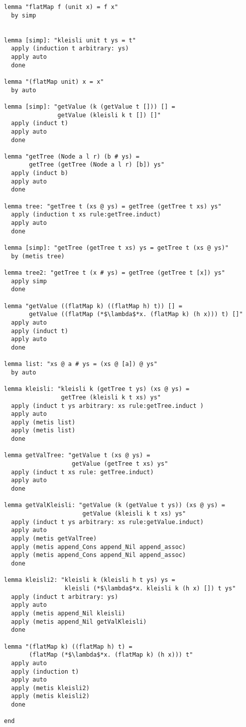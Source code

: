 \begin{lstlisting}[language=Isabelle]
lemma "flatMap f (unit x) = f x"
  by simp


lemma [simp]: "kleisli unit t ys = t"
  apply (induction t arbitrary: ys)
  apply auto
  done

lemma "(flatMap unit) x = x"
  by auto
  
lemma [simp]: "getValue (k (getValue t [])) [] = 
               getValue (kleisli k t []) []"
  apply (induct t)
  apply auto
  done

lemma "getTree (Node a l r) (b # ys) = 
       getTree (getTree (Node a l r) [b]) ys"
  apply (induct b)
  apply auto
  done

lemma tree: "getTree t (xs @ ys) = getTree (getTree t xs) ys"
  apply (induction t xs rule:getTree.induct)
  apply auto
  done

lemma [simp]: "getTree (getTree t xs) ys = getTree t (xs @ ys)"
  by (metis tree)

lemma tree2: "getTree t (x # ys) = getTree (getTree t [x]) ys"
  apply simp
  done

lemma "getValue ((flatMap k) ((flatMap h) t)) [] = 
       getValue ((flatMap (*$\lambda$*x. (flatMap k) (h x))) t) []"
  apply auto
  apply (induct t)
  apply auto
  done

lemma list: "xs @ a # ys = (xs @ [a]) @ ys"
  by auto

lemma kleisli: "kleisli k (getTree t ys) (xs @ ys) = 
                getTree (kleisli k t xs) ys"
  apply (induct t ys arbitrary: xs rule:getTree.induct )
  apply auto
  apply (metis list)
  apply (metis list)
  done

lemma getValTree: "getValue t (xs @ ys) = 
                   getValue (getTree t xs) ys"
  apply (induct t xs rule: getTree.induct)
  apply auto
  done

lemma getValKleisli: "getValue (k (getValue t ys)) (xs @ ys) = 
                      getValue (kleisli k t xs) ys"
  apply (induct t ys arbitrary: xs rule:getValue.induct)
  apply auto
  apply (metis getValTree)
  apply (metis append_Cons append_Nil append_assoc)
  apply (metis append_Cons append_Nil append_assoc)
  done

lemma kleisli2: "kleisli k (kleisli h t ys) ys = 
                 kleisli (*$\lambda$*x. kleisli k (h x) []) t ys"
  apply (induct t arbitrary: ys)
  apply auto 
  apply (metis append_Nil kleisli)
  apply (metis append_Nil getValKleisli)
  done

lemma "(flatMap k) ((flatMap h) t) = 
       (flatMap (*$\lambda$*x. (flatMap k) (h x))) t"
  apply auto
  apply (induction t)
  apply auto
  apply (metis kleisli2)
  apply (metis kleisli2)
  done

end

\end{lstlisting}

